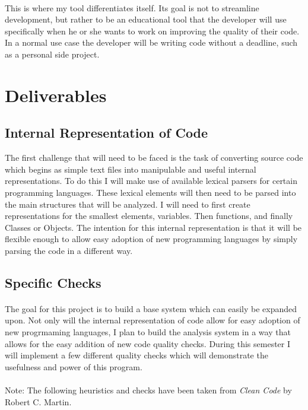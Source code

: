 \documentclass{article}
\begin{document}
\paragraph{}
This is where my tool differentiates itself. Its goal is not to streamline development, but rather to be an educational tool that the developer will use specifically when he or she wants to work on improving the quality of their code. In a normal use case the developer will be writing code without a deadline, such as a personal side project.

\section{Deliverables}
\subsection*{Internal Representation of Code}
The first challenge that will need to be faced is the task of converting source code which begins as simple text files into manipulable and useful internal representations. To do this I will make use of available lexical parsers for certain programming languages. These lexical elements will then need to be parsed into the main structures that will be analyzed. I will need to first create representations for the smallest elements, variables. Then functions, and finally Classes or Objects. The intention for this internal representation is that it will be flexible enough to allow easy adoption of new programming languages by simply parsing the code in a different way.
\subsection{Specific Checks}
\paragraph{}
The goal for this project is to build a base system which can easily be expanded upon. Not only will the internal representation of code allow for easy adoption of new progrmaming languages, I plan to build the analysis system in a way that allows for the easy addition of new code quality checks. During this semester I will implement a few different quality checks which will demonstrate the usefulness and power of this program.
\paragraph{} 
Note: The following heuristics and checks have been taken from \textit{Clean Code} by Robert C. Martin.
\end{document}
